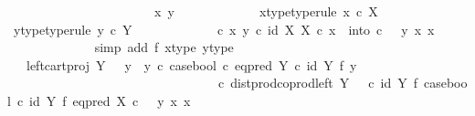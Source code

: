 \begin{isabellebody}
\ \ \ \ \ \ \ \ \isamarkupfalse%
\ {\isacharminus}{\kern0pt}\ \isanewline
\ \ \ \ \ \ \ \ \ \ \isamarkupfalse%
\ x\ y\ \isanewline
\ \ \ \ \ \ \ \ \ \ \isamarkupfalse%
\ x{\isacharunderscore}{\kern0pt}type{\isacharbrackleft}{\kern0pt}type{\isacharunderscore}{\kern0pt}rule{\isacharbrackright}{\kern0pt}{\isacharcolon}{\kern0pt}\ {\isachardoublequoteopen}x\ {\isasymin}\isactrlsub c\ X{\isachardoublequoteclose}\isanewline
\ \ \ \ \ \ \ \ \ \ \isamarkupfalse%
\ y{\isacharunderscore}{\kern0pt}type{\isacharbrackleft}{\kern0pt}type{\isacharunderscore}{\kern0pt}rule{\isacharbrackright}{\kern0pt}{\isacharcolon}{\kern0pt}\ {\isachardoublequoteopen}y\ {\isasymin}\isactrlsub c\ Y{\isachardoublequoteclose}\isanewline
\ \ \ \ \ \ \ \ \ \ \isamarkupfalse%
\ {\isachardoublequoteopen}{\isacharparenleft}{\kern0pt}{\isasymTheta}\ {\isasymcirc}\isactrlsub c\ {\isasymlangle}x{\isacharcomma}{\kern0pt}\ y{\isasymrangle}{\isacharparenright}{\kern0pt}\isactrlsup {\isasymflat}\ {\isasymcirc}\isactrlsub c\ {\isasymlangle}id\ X{\isacharcomma}{\kern0pt}\ {\isasymbeta}\isactrlbsub X\isactrlesub {\isasymrangle}\ {\isasymcirc}\isactrlsub c\ x\ {\isacharequal}{\kern0pt}\ into\ {\isasymcirc}\isactrlsub c\ \ \ {\isasymlangle}y{\isacharcomma}{\kern0pt}\ {\isasymlangle}x{\isacharcomma}{\kern0pt}\ x{\isasymrangle}{\isasymrangle}{\isachardoublequoteclose}\isanewline
\ \ \ \ \ \ \ \ \ \ \ \ \isamarkupfalse%
\ {\isacharparenleft}{\kern0pt}simp\ add{\isacharcolon}{\kern0pt}\ f{}\ x{\isacharunderscore}{\kern0pt}type\ y{\isacharunderscore}{\kern0pt}type{\isacharparenright}{\kern0pt}\isanewline
\ \ \ \ \ \ \ \ \ \ \isamarkupfalse%
\ \isamarkupfalse%
\ {\isachardoublequoteopen}{\isachardot}{\kern0pt}{\isachardot}{\kern0pt}{\isachardot}{\kern0pt}\ {\isacharequal}{\kern0pt}\ {\isacharparenleft}{\kern0pt}left{\isacharunderscore}{\kern0pt}cart{\isacharunderscore}{\kern0pt}proj\ Y\ {\isasymone}\ {\isasymamalg}\ {\isacharparenleft}{\kern0pt}{\isacharparenleft}{\kern0pt}y{}\ {\isasymamalg}\ y{}{\isacharparenright}{\kern0pt}\ {\isasymcirc}\isactrlsub c\ case{\isacharunderscore}{\kern0pt}bool\ {\isasymcirc}\isactrlsub c\ eq{\isacharunderscore}{\kern0pt}pred\ Y\ {\isasymcirc}\isactrlsub c\ {\isacharparenleft}{\kern0pt}id\ Y\ {\isasymtimes}\isactrlsub f\ y{}{\isacharparenright}{\kern0pt}{\isacharparenright}{\kern0pt}{\isacharparenright}{\kern0pt}\isanewline
\ \ \ \ \ \ \ \ \ \ \ \ \ \ \ \ \ \ \ \ \ \ \ \ \ \ \ \ \ \ \ \ \ {\isasymcirc}\isactrlsub c\ dist{\isacharunderscore}{\kern0pt}prod{\isacharunderscore}{\kern0pt}coprod{\isacharunderscore}{\kern0pt}left\ Y\ {\isasymone}\ {\isasymone}\ {\isasymcirc}\isactrlsub c\ {\isacharparenleft}{\kern0pt}id\ Y\ {\isasymtimes}\isactrlsub f\ case{\isacharunderscore}{\kern0pt}bool{\isacharparenright}{\kern0pt}\ {\isasymcirc}\isactrlsub c\ {\isacharparenleft}{\kern0pt}id\ Y\ {\isasymtimes}\isactrlsub f\ eq{\isacharunderscore}{\kern0pt}pred\ X{\isacharparenright}{\kern0pt}\ {\isasymcirc}\isactrlsub c\ \ \ {\isasymlangle}y{\isacharcomma}{\kern0pt}\ {\isasymlangle}x{\isacharcomma}{\kern0pt}\ x{\isasymrangle}{\isasymrangle}{\isachardoublequoteclose}\isanewline

\end{isabellebody}
